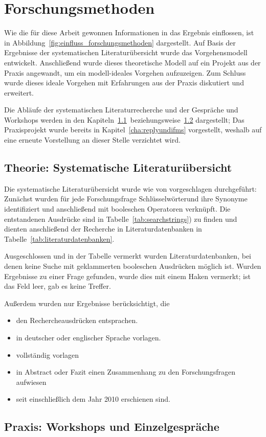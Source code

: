 \section{Forschungsmethoden}
\label{cha:method}
Wie die für diese Arbeit gewonnen Informationen in das Ergebnis einflossen, ist 
in Abbildung~\ref{fig:einfluss_forschungsmethoden} dargestellt. Auf Basis der 
Ergebnisse der systematischen Literaturübersicht wurde das Vorgehensmodell 
entwickelt. Anschließend wurde dieses theoretische Modell auf ein Projekt aus 
der Praxis angewandt, um ein modell-ideales Vorgehen aufzuzeigen. Zum Schluss 
wurde dieses ideale Vorgehen mit Erfahrungen aus der Praxis diskutiert und 
erweitert.

Die Abläufe der systematischen Literaturrecherche und der Gespräche und 
Workshops werden in den 
Kapiteln~\ref{cha:literaturuebersicht}~beziehungsweise~\ref{cha:praxis} 
dargestellt; Das Praxisprojekt wurde bereits in Kapitel~\ref{cha:replyundifms} 
vorgestellt, weshalb auf eine erneute Vorstellung an dieser Stelle verzichtet 
wird.
\subsection{Theorie: Systematische Literaturübersicht}
\label{cha:literaturuebersicht}
Die systematische Literaturübersicht wurde wie von  
vorgeschlagen durchgeführt: Zunächst wurden für jede Forschungsfrage 
Schlüsselwörterund ihre Synonyme identifiziert und anschließend mit booleschen 
Operatoren verknüpft. Die entstandenen Ausdrücke sind in 
Tabelle~\ref{tab:searchstrings}) zu finden und dienten anschließend der 
Recherche in Literaturdatenbanken in Tabelle~\ref{tab:literaturdatenbanken}.


Ausgeschlossen und in der Tabelle vermerkt wurden Literaturdatenbanken, bei 
denen keine Suche mit geklammerten booleschen Ausdrücken möglich ist. Wurden 
Ergebnisse zu einer Frage gefunden, wurde dies mit einem Haken vermerkt; ist 
das Feld leer, gab es keine Treffer.

Außerdem wurden nur Ergebnisse berücksichtigt, die
\begin{itemize}
	\item den Rechercheausdrücken entsprachen.
	\item in deutscher oder englischer Sprache vorlagen.
	\item vollständig vorlagen
	\item in Abstract oder Fazit einen Zusammenhang zu den Forschungsfragen
aufwiesen
	\item seit einschließlich dem Jahr 2010 erschienen sind.
\end{itemize}

\begin{comment}
In diesem Kapitel erläutern Sie ihre Forschungsmethode unter Verwendung von
entsprechenden Quellen.
Begründen Sie auch, warum Sie sich für diese Forschungsmethode entschieden
haben
und warum sie geeignet ist, die vorliegende Forschungsfrage zu beantworten.
\end{comment}
\subsection{Praxis: Workshops und Einzelgespräche}
\label{cha:praxis}